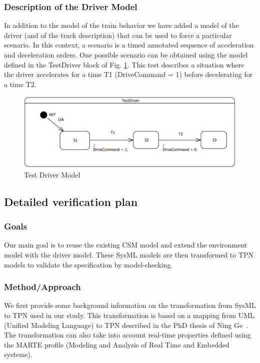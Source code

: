 \subsubsection{Description of the Driver Model}

In addition to the model of the train behavior we have added a model
of the driver (and of the track description) that can be used to force
a particular scenario. In this context, a scenario is a timed
annotated sequence of acceleration and deceleration orders. One
possible scenario can be obtained using the model defined in the
TestDriver block of Fig. \ref{fig:driver}. This test describes a
situation where the driver accelerates for a time T1 (DriveCommand =
1) before decelerating for a time T2. 

\begin{figure}[ht!]
  \centering
  \includegraphics[height=0.18\textheight]{figures/driver}
  \caption{Test Driver Model}
  \label{fig:driver}
\end{figure}

\subsection{Detailed verification plan}

\subsubsection{Goals}

Our main goal is to reuse the existing CSM model and extend the environment model with the driver model. These SysML models are then transformed to TPN models to validate the specification by model-checking. 

\subsubsection{Method/Approach}

We first provide some background information on the transformation from
SysML to TPN used in our study. This transformation
is based on a mapping from UML (Unified Modeling Language) to TPN
described in the PhD thesis of Ning Ge~\cite{Ge2014}. The
transformation can also take into account real-time properties defined
using the MARTE profile (Modeling and Analysis of Real Time and
Embedded systems). 


